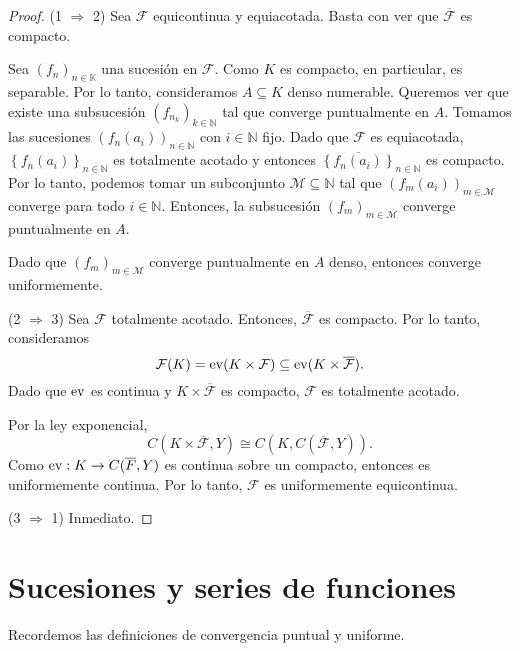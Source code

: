 \begin{proof}
	(1 $\Rightarrow$ 2) Sea $\mathcal{F}$ equicontinua y equiacotada. Basta con ver que $\overline{\mathcal{F}}$ es compacto.

	Sea $(f_n)_{n \in \mathbb{K}}$ una sucesión en $\mathcal{F}$. Como $K$ es compacto, en particular, es separable. Por lo tanto, consideramos $A \subseteq K$ denso numerable. Queremos ver que existe una subsucesión $(f_{n_k})_{k \in \mathbb{N}}$ tal que converge puntualmente en $A$. Tomamos las sucesiones $(f_n(a_i))_{n \in \mathbb{N}}$ con $i \in \mathbb{N}$ fijo. Dado que $\mathcal{F}$ es equiacotada, $\left\{ f_n(a_i) \right\}_{n \in \mathbb{N}}$ es totalmente acotado y entonces $\overline{\left\{ f_n(a_i) \right\}}_{n \in \mathbb{N}}$ es compacto. Por lo tanto, podemos tomar un subconjunto $\mathcal{M} \subseteq \mathbb{N}$ tal que $(f_m(a_i))_{m \in \mathcal{M}}$ converge para todo $i \in \mathbb{N}$. Entonces, la subsucesión $(f_m)_{m \in \mathcal{M}}$ converge puntualmente en $A$.

	Dado que $(f_m)_{m \in \mathcal{M}}$ converge puntualmente en $A$ denso, entonces converge uniformemente.

	(2 $\Rightarrow$ 3) Sea $\mathcal{F}$ totalmente acotado. Entonces, $\overline{\mathcal{F}}$ es compacto. Por lo tanto, consideramos
	\begin{equation*}
		\mathcal{F}(K) = \operatorname{ev} (K \times \mathcal{F}) \subseteq \operatorname{ev} (K \times \overline{\mathcal{F}}).
	\end{equation*}
	Dado que $\operatorname{ev}$ es continua y $K \times \overline{\mathcal{F}}$ es compacto, $\mathcal{F}$ es totalmente acotado.

	Por la ley exponencial,
	\begin{equation*}
		C(K \times \overline{\mathcal{F}}, Y) \cong C(K, C(\overline{\mathcal{F}}, Y)).
	\end{equation*}
	Como $\operatorname{ev} : K \to C(\overline{F}, Y)$ es continua sobre un compacto, entonces es uniformemente continua. Por lo tanto, $\mathcal{F}$ es uniformemente equicontinua.

	(3 $\Rightarrow$ 1) Inmediato.
\end{proof}

\section{Sucesiones y series de funciones}

Recordemos las definiciones de convergencia puntual y uniforme.

